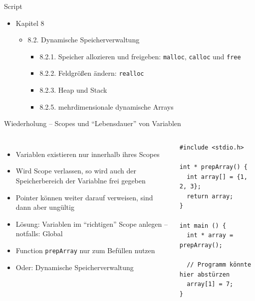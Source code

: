 
\begin{frame}{Script}
%
\begin{itemize}
\item Kapitel 8
	\begin{itemize}
	\item 8.2. Dynamische Speicherverwaltung
		\begin{itemize}
		\item 8.2.1. Speicher allozieren und freigeben: \texttt{malloc}, \texttt{calloc} und \texttt{free}
		\item 8.2.2. Feldgrößen ändern: \texttt{realloc}
		\item 8.2.3. Heap und Stack
		\item 8.2.5. mehrdimensionale dynamische Arrays
		\end{itemize}
	\end{itemize}
\end{itemize}
%
\end{frame}


\begin{frame}[fragile]{Wiederholung -- Scopes und \enquote{Lebensdauer} von Variablen}
%
\begin{columns}[T]
\begin{itemize}
\item Variablen existieren nur innerhalb  ihres Scopes
\item Wird Scope verlassen, so wird auch der Speicherbereich der Variablne frei gegeben
\item Pointer können weiter darauf verweisen, sind dann aber ungültig
\item Lösung: Variablen im \enquote{richtigen} Scope anlegen -- notfalls: Global
\item Function \texttt{prepArray} nur zum Befüllen nutzen
\item Oder: Dynamische Speicherverwaltung
\end{itemize}
%
\begin{warnbox}[Arrayzugriff außerhalb Lebensdauer, leftupper=6mm]
\begin{verbatim}
#include <stdio.h>

int * prepArray() {
  int array[] = {1, 2, 3};
  return array;
}

int main () {
  int * array = prepArray();
  
  // Programm könnte hier abstürzen
  array[1] = 7;
}
\end{verbatim}
\end{warnbox}
\end{columns}
%
\end{frame}

